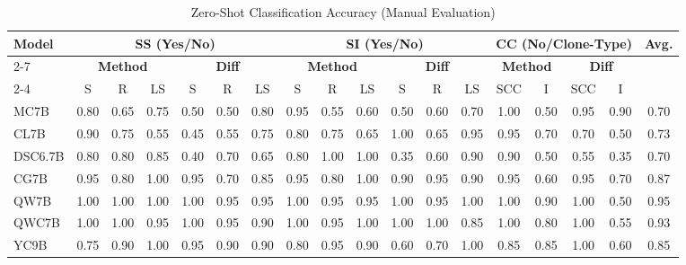 \begin{table}[t]
\centering
\caption{Zero-Shot Classification Accuracy (Manual Evaluation)}
\label{tab:manual_zeroshot_accuracy}
\footnotesize
\setlength{\tabcolsep}{2pt}
\renewcommand{\arraystretch}{1.1}
\begin{tabular}{l|ccc|ccc|ccc|ccc|cc|cc|c}
\multirow{4}{*}{\textbf{Model}}
& \multicolumn{6}{c|}{\textbf{SS (Yes/No)}}
& \multicolumn{6}{c|}{\textbf{SI (Yes/No)}}
& \multicolumn{4}{c|}{\textbf{CC (No/Clone-Type)}}
& \multirow{4}{*}{\textbf{Avg.}} \\
\cline{2-7}\cline{8-13}\cline{14-17}
& \multicolumn{3}{c|}{\textbf{Method}} & \multicolumn{3}{c|}{\textbf{Diff}}
& \multicolumn{3}{c|}{\textbf{Method}} & \multicolumn{3}{c|}{\textbf{Diff}}
& \multicolumn{2}{c|}{\textbf{Method}} & \multicolumn{2}{c|}{\textbf{Diff}} & \\
\cline{2-4}\cline{5-7}\cline{8-10}\cline{11-13}\cline{14-15}\cline{16-17}
& S & R & LS & S & R & LS & S & R & LS & S & R & LS & SCC & I & SCC & I & \\
\hline
MC7B & 0.80 & 0.65 & 0.75 & 0.50 & 0.50 & 0.80 & 0.95 & 0.55 & 0.60 & 0.50 & 0.60 & 0.70 & \cellcolor{blue!15}1.00 & 0.50 & 0.95 & 0.90 & 0.70 \\
\hline
CL7B & 0.90 & 0.75 & 0.55 & 0.45 & 0.55 & 0.75 & 0.80 & 0.75 & 0.65 & \cellcolor{blue!15}1.00 & 0.65 & 0.95 & 0.95 & 0.70 & 0.70 & 0.50 & 0.73 \\
\hline
DSC6.7B & 0.80 & 0.80 & 0.85 & 0.40 & 0.70 & 0.65 & 0.80 & \cellcolor{blue!15}1.00 & \cellcolor{blue!15}1.00 & 0.35 & 0.60 & 0.90 & 0.90 & 0.50 & 0.55 & 0.35 & 0.70 \\
\hline
CG7B & 0.95 & 0.80 & \cellcolor{blue!15}1.00 & 0.95 & 0.70 & 0.85 & 0.95 & 0.80 & \cellcolor{blue!15}1.00 & 0.90 & 0.95 & 0.90 & 0.95 & 0.60 & 0.95 & 0.70 & 0.87 \\
\hline
QW7B & \cellcolor{blue!15}1.00 & \cellcolor{blue!15}1.00 & \cellcolor{blue!15}1.00 & \cellcolor{blue!15}1.00 & 0.95 & 0.95 & \cellcolor{blue!15}1.00 & 0.95 & 0.95 & \cellcolor{blue!15}1.00 & 0.95 & \cellcolor{blue!15}1.00 & \cellcolor{blue!15}1.00 & 0.90 & \cellcolor{blue!15}1.00 & 0.50 & 0.95 \\
\hline
QWC7B & \cellcolor{blue!15}1.00 & \cellcolor{blue!15}1.00 & 0.95 & \cellcolor{blue!15}1.00 & 0.95 & 0.90 & \cellcolor{blue!15}1.00 & 0.95 & \cellcolor{blue!15}1.00 & \cellcolor{blue!15}1.00 & \cellcolor{blue!15}1.00 & 0.85 & \cellcolor{blue!15}1.00 & 0.80 & \cellcolor{blue!15}1.00 & 0.55 & 0.93 \\
\hline
YC9B & 0.75 & 0.90 & \cellcolor{blue!15}1.00 & 0.95 & 0.90 & 0.90 & 0.80 & 0.95 & 0.90 & 0.60 & 0.70 & \cellcolor{blue!15}1.00 & 0.85 & 0.85 & \cellcolor{blue!15}1.00 & 0.60 & 0.85 \\

\end{tabular}
\end{table}
